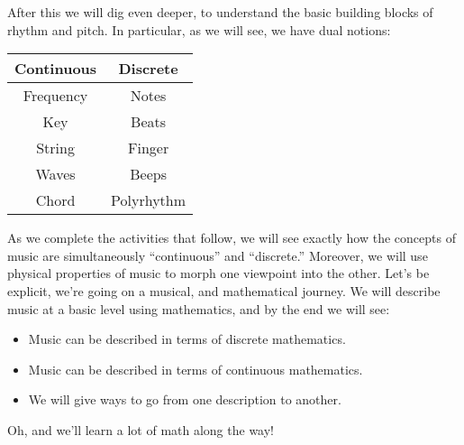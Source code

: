 \documentclass[12pt]{ximera}
\begin{document}
After this we will dig even deeper, to understand the basic building blocks of rhythm and pitch. 
In particular, as we will see, we have dual notions:
\begin{center}
\begin{tabular}{c|c}
 Continuous    & Discrete \\ \hline\hline
   Frequency  & Notes \\
   Key & Beats\\
   String & Finger \\
   Waves &  Beeps \\
   Chord & Polyrhythm
\end{tabular}
\end{center}


As we complete the activities that follow, we will see exactly how the concepts of music are simultaneously ``continuous'' and ``discrete.'' Moreover, we will use physical properties of music to morph one viewpoint into the other. Let's be explicit, we're going on a musical, and mathematical journey. We will describe music at a basic level using mathematics, and by the end we will see:
\begin{itemize}
    \item Music can be described in terms of discrete mathematics.
    \item Music can be described in terms of continuous mathematics.
    \item We will give ways to go from one description to another.
\end{itemize}




Oh, and we'll learn a lot of math along the way!
\end{document}
